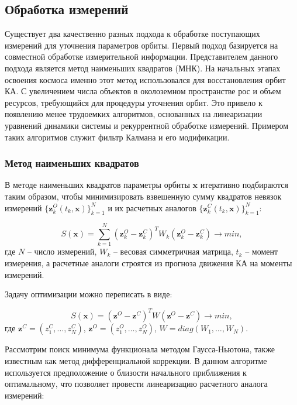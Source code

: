 \subsection{Обработка измерений}
Существует два качественно разных подхода к обработке поступающих измерений
для уточнения параметров орбиты.
Первый подход базируется на совместной обработке измерительной информации. 
Представителем данного подхода является метод наименьших квадратов (МНК).
На начальных этапах освоения космоса именно этот метод использовался
для восстановления орбит КА. 
С увеличением числа объектов в околоземном пространстве рос и объем ресурсов, 
требующийся для процедуры уточнения орбит.
Это привело к появлению менее трудоемких алгоритмов, основанных 
на линеаризации уравнений динамики системы и рекуррентной обработке измерений. Примером таких
алгоритмов служит фильтр Калмана и его модификации.

\subsubsection{Метод наименьших квадратов}
В методе наименьших квадратов параметры орбиты $\mathbf{x}$ итеративно 
подбираются таким образом,
чтобы минимизировать взвешенную сумму квадратов невязок измерений 
$\{\mathbf{z}^O_k (t_k, \mathbf{x})\}_{k=1}^N$ 
и их расчетных аналогов $\{\mathbf{z}_k^C (t_k, \mathbf{x})\}_{k=1}^N$:

\begin{equation}
    S(\mathbf{x}) = \sum_{k=1}^{N} (\mathbf{z}^O_k - \mathbf{z}^C_k)^T W_k 
    (\mathbf{z}^O_k - \mathbf{z}^C_k) \rightarrow min,
\end{equation}
где $N$ -- число измерений, $W_k$ -- весовая симметричная матрица, $t_k$ -- момент измерения, а
расчетные аналоги строятся из прогноза движения КА на моменты измерений.

Задачу оптимизации можно переписать в виде:

\begin{equation*}
    S(\mathbf{x}) = (\mathbf{z}^O - \mathbf{z}^C)^T W (\mathbf{z}^O - \mathbf{z}^C) \rightarrow min,
\end{equation*}
где $\mathbf{z}^C = (z_1^C, \dots, z_N^C)$, 
$\mathbf{z}^O = (z_1^O, \dots, z_N^O)$, $W = diag(W_1, \dots, W_N)$.

Рассмотрим поиск минимума функционала методом Гаусса-Ньютона, также
известным как метод дифференциальной коррекции. В данном алгоритме 
используется предположение о близости начального приближения к оптимальному, что позволяет
провести линеаризацию расчетного аналога измерений:

